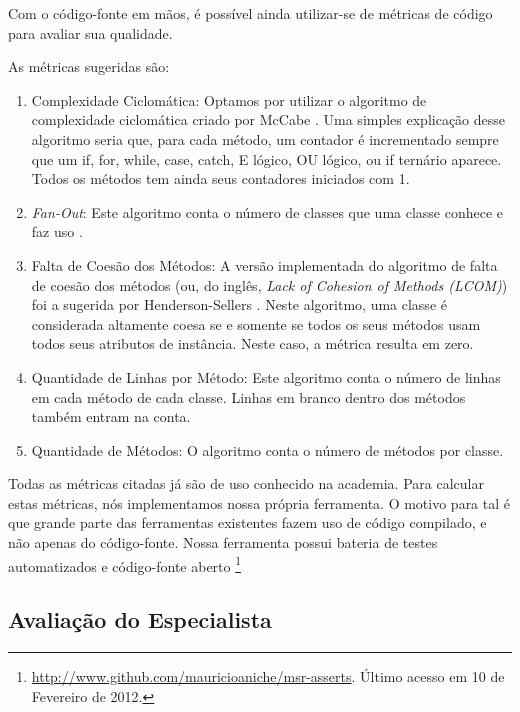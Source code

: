 Com o código-fonte em mãos, é possível ainda utilizar-se de métricas de código
para avaliar sua qualidade.

As métricas sugeridas são:

\begin{enumerate}
	\item Complexidade Ciclomática: Optamos por utilizar o algoritmo de complexidade ciclomática criado
	por McCabe \cite{mccabe}. Uma simples explicação desse algoritmo seria que, para cada método, um contador
	é incrementado sempre que um if, for, while, case, catch, E lógico, OU lógico, ou if ternário aparece.
	Todos os métodos tem ainda seus contadores iniciados com 1. 
	
	\item \textit{Fan-Out}: Este algoritmo conta o número de classes que uma classe conhece e faz uso \cite{lorenz}.
	
	\item Falta de Coesão dos Métodos: A versão implementada do algoritmo de falta de coesão dos métodos 
	(ou, do inglês, \textit{Lack of Cohesion of Methods (LCOM)}) foi a sugerida por Henderson-Sellers \cite{lcom-hs}.
	Neste algoritmo, uma classe é considerada altamente coesa se e somente se todos os seus métodos usam
	todos seus atributos de instância. Neste caso, a métrica resulta em zero. 
	
	\item Quantidade de Linhas por Método: Este algoritmo conta o número de linhas em cada método de
	cada classe. Linhas em branco dentro dos métodos também entram na conta.
	
	\item Quantidade de Métodos: O algoritmo conta o número de métodos por classe.
	
\end{enumerate}

Todas as métricas citadas já são de uso conhecido na academia. Para calcular estas
métricas, nós implementamos nossa própria ferramenta. O motivo para tal é que
grande parte das ferramentas existentes fazem uso de código compilado, e não
apenas do código-fonte. Nossa ferramenta possui bateria de testes automatizados
e código-fonte aberto \footnote{\url{http://www.github.com/mauricioaniche/msr-asserts}. 
Último acesso em 10 de Fevereiro de 2012.}

\subsection{Avaliação do Especialista}
\label{sec:planejamento-especialista}

